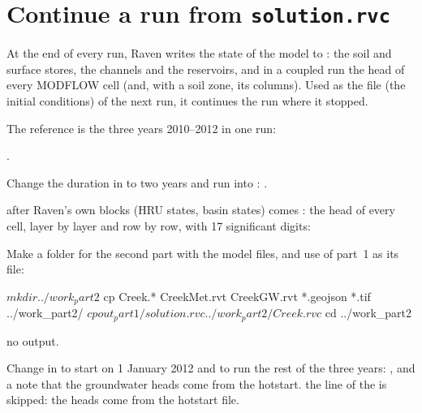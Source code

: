 \section{Continue a run from \texttt{solution.rvc}}
At the end of every run, Raven writes the state of the model to : the soil and surface stores, the
channels and the reservoirs, and in a coupled run the head of every MODFLOW cell (and, with a soil zone, its columns). Used
as the  file (the initial conditions) of the next run, it continues the run where it stopped.

The reference is the three years 2010--2012 in one run:
\see {}.

Change the duration in  to two years and run into :
\see {}.

\why after Raven's own blocks (HRU states, basin states) comes : the head of every cell,
layer by layer and row by row, with 17 significant digits:

Make a folder for the second part with the model files, and use  of part~1 as its  file:
\begin{shell}
$ mkdir ../work_part2
$ cp Creek.* CreekMet.rvt CreekGW.rvt *.geojson *.tif ../work_part2/
$ cp out_part1/solution.rvc ../work_part2/Creek.rvc
$ cd ../work_part2
\end{shell}
\see no output.

Change  in  to start on 1 January 2012 and to run the rest of the three years:
\see {}, and a note that the groundwater heads come from the hotstart.
\why the line  of the  is skipped: the heads come from the hotstart file.

